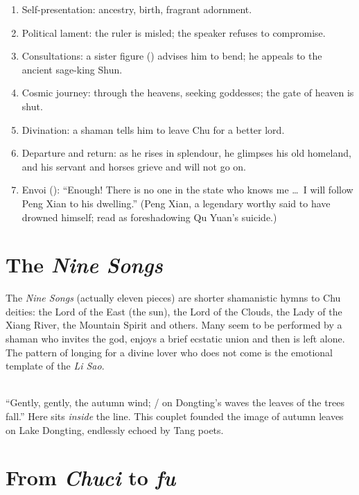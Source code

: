 \begin{enumerate}
  \item Self-presentation: ancestry, birth, fragrant adornment.
  \item Political lament: the ruler is misled; the speaker refuses to compromise.
  \item Consultations: a sister figure () advises him to bend; he appeals to the
        ancient sage-king Shun.
  \item Cosmic journey: through the heavens, seeking goddesses; the gate of heaven is shut.
  \item Divination: a shaman tells him to leave Chu for a better lord.
  \item Departure and return: as he rises in splendour, he glimpses his old homeland, and
        his servant and horses grieve and will not go on.
  \item Envoi (): ``Enough! There is no one in the state who knows me \ldots\ I
        will follow Peng Xian to his dwelling.'' (Peng Xian, a legendary worthy said to
        have drowned himself; read as foreshadowing Qu Yuan's suicide.)
\end{enumerate}

\section{The \emph{Nine Songs} }

The \emph{Nine Songs} (actually eleven pieces) are shorter shamanistic hymns to Chu
deities: the Lord of the East (the sun), the Lord of the Clouds, the Lady of the Xiang
River, the Mountain Spirit and others. Many seem to be performed by a shaman who invites the
god, enjoys a brief ecstatic union and then is left alone. The pattern of longing for a
divine lover who does not come is the emotional template of the \emph{Li Sao}.

\begin{example}
 \\
``Gently, gently, the autumn wind; / on Dongting's waves the leaves of the trees fall.''
Here  sits \emph{inside} the line. This couplet founded the image of autumn
leaves on Lake Dongting, endlessly echoed by Tang poets.
\end{example}

\section{From \emph{Chuci} to \emph{fu}}


